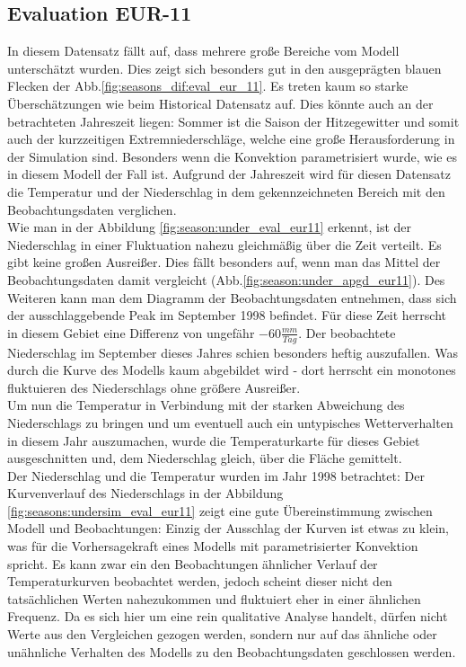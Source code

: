 \subsection{Evaluation EUR-11}\label{sec:eval_eur_11}
In diesem Datensatz fällt auf, dass mehrere große Bereiche vom Modell unterschätzt wurden. Dies zeigt sich besonders gut in den ausgeprägten blauen Flecken der Abb.\ref{fig:seasons_dif:eval_eur_11}. Es treten kaum so starke Überschätzungen wie beim Historical Datensatz auf. Dies könnte auch an der betrachteten Jahreszeit liegen: Sommer ist die Saison der Hitzegewitter und somit auch der kurzzeitigen Extremniederschläge, welche eine große Herausforderung in der Simulation sind. Besonders wenn die Konvektion parametrisiert wurde, wie es in diesem Modell der Fall ist. Aufgrund der Jahreszeit wird für diesen Datensatz die Temperatur und der Niederschlag in dem gekennzeichneten Bereich mit den Beobachtungsdaten verglichen.\\
Wie man in der Abbildung \ref{fig:season:under_eval_eur11} erkennt, ist der Niederschlag in einer Fluktuation nahezu gleichmäßig über die Zeit verteilt. Es gibt keine großen Ausreißer. Dies fällt besonders auf, wenn man das Mittel der Beobachtungsdaten damit vergleicht (Abb.\ref{fig:season:under_apgd_eur11}). Des Weiteren kann man dem Diagramm der Beobachtungsdaten entnehmen, dass sich der ausschlaggebende Peak im September 1998 befindet. Für diese Zeit herrscht in diesem Gebiet eine Differenz von ungefähr $-60\frac{mm}{Tag}$. Der beobachtete Niederschlag im September dieses Jahres schien besonders heftig auszufallen. Was durch die Kurve des Modells kaum abgebildet wird - dort herrscht ein monotones fluktuieren des Niederschlags ohne größere Ausreißer.\\
Um nun die Temperatur in Verbindung mit der starken Abweichung des Niederschlags zu bringen und um eventuell auch ein untypisches Wetterverhalten in diesem Jahr auszumachen, wurde die Temperaturkarte für dieses Gebiet ausgeschnitten und, dem Niederschlag gleich, über die Fläche gemittelt.\\
Der Niederschlag und die Temperatur wurden im Jahr 1998 betrachtet: Der Kurvenverlauf des Niederschlags in der Abbildung \ref{fig:seasons:undersim_eval_eur11} zeigt eine gute Übereinstimmung zwischen Modell und Beobachtungen: Einzig der Ausschlag der Kurven ist etwas zu klein, was für die Vorhersagekraft eines Modells mit parametrisierter Konvektion spricht. Es kann zwar ein den Beobachtungen ähnlicher Verlauf der Temperaturkurven beobachtet werden, jedoch scheint dieser nicht den tatsächlichen Werten nahezukommen und fluktuiert eher in einer ähnlichen Frequenz. Da es sich hier um eine rein qualitative Analyse handelt, dürfen nicht Werte aus den Vergleichen gezogen werden, sondern nur auf das ähnliche oder unähnliche Verhalten des Modells zu den Beobachtungsdaten geschlossen werden.

